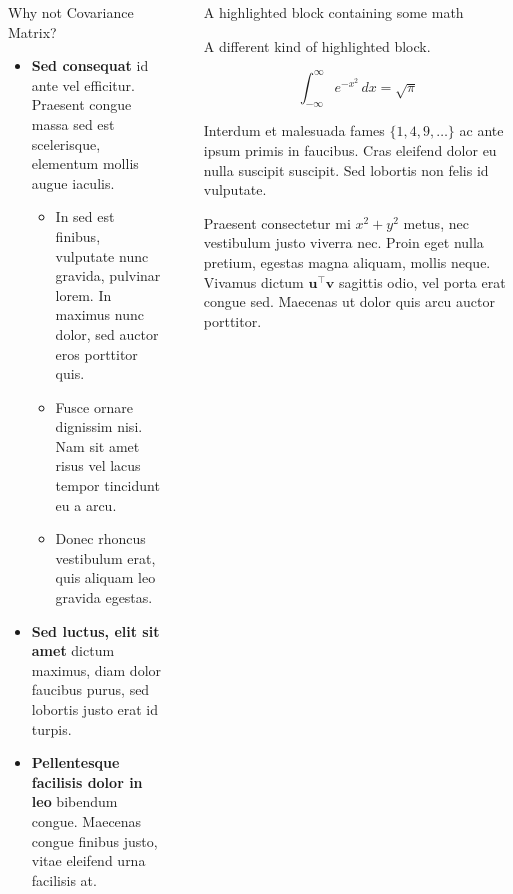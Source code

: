 \documentclass[final]{beamer}
\newlength{\sepwidth}
\newlength{\colwidth}
\newcommand{\separatorcolumn}{\begin{column}{\sepwidth}\end{column}}
\begin{document}
\begin{frame}[t]
\begin{columns}[t]
\begin{column}{\colwidth}
\begin{block}{Why not Covariance Matrix?}
    \begin{itemize}
      \item \textbf{Sed consequat} id ante vel efficitur. Praesent congue massa
        sed est scelerisque, elementum mollis augue iaculis.
        \begin{itemize}
          \item In sed est finibus, vulputate
            nunc gravida, pulvinar lorem. In maximus nunc dolor, sed auctor eros
            porttitor quis.
          \item Fusce ornare dignissim nisi. Nam sit amet risus vel lacus
            tempor tincidunt eu a arcu.
          \item Donec rhoncus vestibulum erat, quis aliquam leo
            gravida egestas.
        \end{itemize}
      \item \textbf{Sed luctus, elit sit amet} dictum maximus, diam dolor
        faucibus purus, sed lobortis justo erat id turpis.
      \item \textbf{Pellentesque facilisis dolor in leo} bibendum congue.
        Maecenas congue finibus justo, vitae eleifend urna facilisis at.
    \end{itemize}

  \end{block}

\end{column}

\separatorcolumn

\begin{column}{\colwidth}

  \begin{exampleblock}{A highlighted block containing some math}

    A different kind of highlighted block.

    $$
    \int_{-\infty}^{\infty} e^{-x^2}\,dx = \sqrt{\pi}
    $$

    Interdum et malesuada fames $\{1, 4, 9, \ldots\}$ ac ante ipsum primis in
    faucibus. Cras eleifend dolor eu nulla suscipit suscipit. Sed lobortis non
    felis id vulputate.


    Praesent consectetur mi $x^2 + y^2$ metus, nec vestibulum justo viverra
    nec. Proin eget nulla pretium, egestas magna aliquam, mollis neque. Vivamus
    dictum $\mathbf{u}^\intercal\mathbf{v}$ sagittis odio, vel porta erat
    congue sed. Maecenas ut dolor quis arcu auctor porttitor.


\end{exampleblock}
\end{column}
\end{columns}
\end{frame}
\end{document}
